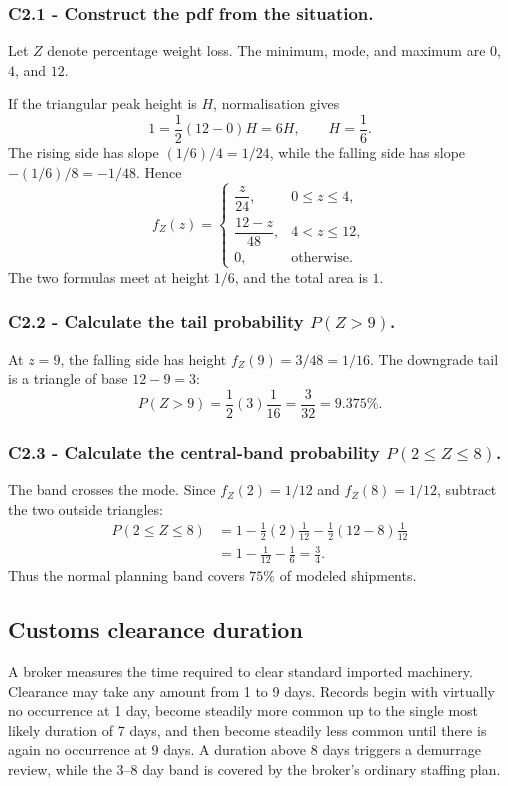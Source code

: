 \subsubsection*{C2.1 - Construct the pdf from the situation.}
\label{subsec:c2-triangular-produce-a}
Let $Z$ denote percentage weight loss.  The minimum, mode, and maximum are
$0$, $4$, and $12$.

If the triangular peak height is $H$, normalisation gives
\[
 1=\frac12(12-0)H=6H,\qquad H=\frac16.
\]
The rising side has slope $(1/6)/4=1/24$, while the falling side has slope
$-(1/6)/8=-1/48$.  Hence
\[
 f_Z(z)=\begin{cases}
 \dfrac{z}{24},&0\le z\le4,\\[2mm]
 \dfrac{12-z}{48},&4<z\le12,\\[2mm]
 0,&\text{otherwise.}
 \end{cases}
\]
The two formulas meet at height $1/6$, and the total area is $1$.

\subsubsection*{C2.2 - Calculate the tail probability $P(Z>9)$.}
\label{subsec:c2-triangular-produce-b}
At $z=9$, the falling side has height $f_Z(9)=3/48=1/16$.  The
downgrade tail is a triangle of base $12-9=3$:
\[
 P(Z>9)=\frac12(3)\frac1{16}=\frac3{32}=9.375\%.
\]

\subsubsection*{C2.3 - Calculate the central-band probability
$P(2\le Z\le8)$.}
\label{subsec:c2-triangular-produce-c}
The band crosses the mode.  Since $f_Z(2)=1/12$ and $f_Z(8)=1/12$, subtract
the two outside triangles:
\[
 \begin{aligned}
 P(2\le Z\le8)
 &=1-\frac12(2)\frac1{12}-\frac12(12-8)\frac1{12}\\
 &=1-\frac1{12}-\frac16=\frac34.
 \end{aligned}
\]
Thus the normal planning band covers $75\%$ of modeled shipments.

\subsection{Customs clearance duration}\label{sec:c2-triangular-clearance}
A broker measures the time required to clear standard imported machinery.
Clearance may take any amount from 1 to 9 days.  Records begin with virtually
no occurrence at 1 day, become steadily more common up to the single most
likely duration of 7 days, and then become steadily less common until there is
again no occurrence at 9 days.  A duration above 8 days triggers a
demurrage review, while the 3--8 day band is covered by the broker's ordinary
staffing plan.

